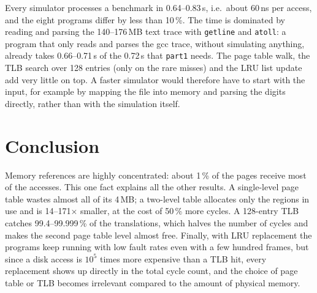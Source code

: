 \documentclass[11pt,a4paper]{article}
\begin{document}
Every simulator processes a benchmark in 0.64--0.83\,s, i.e.\ about 60\,ns per access, and the
eight programs differ by less than 10\,\%. The time is dominated by reading and parsing the
140--176\,MB text trace with \texttt{getline} and \texttt{atoll}: a program that only reads and
parses the gcc trace, without simulating anything, already takes 0.66--0.71\,s of the 0.72\,s that
\texttt{part1} needs. The page table walk, the TLB search over 128 entries (only on the rare
misses) and the LRU list update add very little on top. A faster simulator would therefore have
to start with the input, for example by mapping the file into memory and parsing the digits
directly, rather than with the simulation itself.

\section{Conclusion}

Memory references are highly concentrated: about 1\,\% of the pages receive most of the accesses.
This one fact explains all the other results. A single-level page table wastes almost all of its
4\,MB; a two-level table allocates only the regions in use and is 14--171$\times$ smaller, at the
cost of 50\,\% more cycles. A 128-entry TLB catches 99.4--99.999\,\% of the translations, which
halves the number of cycles and makes the second page table level almost free. Finally, with
LRU replacement the programs keep running with low fault rates even with a few hundred frames, but
since a disk access is $10^{5}$ times more expensive than a TLB hit, every replacement shows up
directly in the total cycle count, and the choice of page table or TLB becomes irrelevant compared
to the amount of physical memory.
\end{document}
